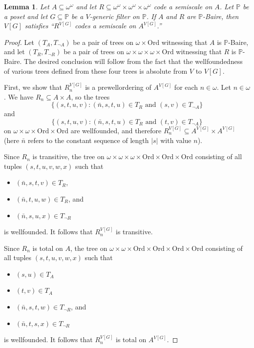 \documentclass[fleqn, 11pt]{amsart}
\theoremstyle{plain}
\newtheorem{lem}[thm]{Lemma} \newtheorem*{lem*}{Lemma}
\theoremstyle{definition}
\theoremstyle{remark}
\newcommand{\Ord}{\mathrm{Ord}}
\begin{document}

\begin{lem}\label{expandscaleslemma}
  Let $A \subseteq \omega^\omega$ and let $R \subseteq \omega^\omega \times \omega^\omega \times \omega^\omega$ code a semiscale on $A$.
  Let $\mathbb{P}$ be a poset and let $G\subseteq \mathbb{P}$ be a $V$-generic filter on $\mathbb{P}$.
  If $A$ and $R$ are $\mathbb{P}$-Baire, then $V[G]$ satisfies ``$R^{V[G]}$ codes a semiscale on $A^{V[G]}$.''
\end{lem}

\begin{proof}
 Let $(T_A, T_{\neg A})$ be a pair of trees on $\omega \times \Ord$ witnessing that $A$ is $\mathbb{P}$-Baire, and let
 $(T_R, T_{\neg R})$ be a pair of trees on $\omega \times \omega \times \omega \times \Ord$ witnessing that $R$ is $\mathbb{P}$-Baire.
 The desired conclusion will follow from the fact that the wellfoundedness of various trees defined from these four trees is absolute from $V$ to $V[G]$.

 First, we show that $R^{V[G]}_n$ is a prewellordering of $A^{V[G]}$ for each $n \in \omega$.
 Let $n \in \omega$.
 We have $R_n \subseteq A \times A$,
so the trees
 \[\{ (s, t, u, v)  : (\bar{n}, s, t, u)   \in T_{R} \text{ and }  (s, v) \in T_{\neg A} \}\] and \[\{ (s, t, u, v)  : (\bar{n}, s, t, u)   \in T_{R} \text{ and } (t, v) \in T_{\neg A} \}\]
 on $\omega \times \omega \times \Ord \times \Ord$
 are wellfounded, and therefore 
 $R^{V[G]}_n \subseteq A^{V[G]} \times A^{V[G]}$ (here $\bar{n}$ refers to the constant sequence of length $|s|$ with value $n$).

Since $R_n$ is transitive, the tree on $\omega \times \omega \times \omega \times \Ord \times \Ord \times \Ord$
consisting of all tuples $(s, t, u, v, w, x)$ such that 
\begin{itemize}
 \item $(\bar{n}, s, t, v) \in T_{R}$,
 \item $(\bar{n}, t, u, w) \in T_{R}$, and
 \item $(\bar{n}, s, u, x) \in T_{\neg R}$
\end{itemize}
is wellfounded. It follows that $R^{V[G]}_n$ is transitive.

Since $R_n$ is total on $A$, the tree
on $\omega \times \omega \times \Ord \times \Ord \times \Ord \times \Ord$
consisting of all tuples
$(s, t, u, v, w, x)$
such that 
\begin{itemize}
 \item $(s, u)   \in T_A$
 \item $(t, v)   \in T_A$
 \item $(\bar{n}, s, t, w) \in T_{\neg R}$, and
 \item $(\bar{n}, t, s, x) \in T_{\neg R}$
\end{itemize}
is wellfounded. It follows that $R^{V[G]}_n$ is total on $A^{V[G]}$.



\end{proof}
\end{document}
